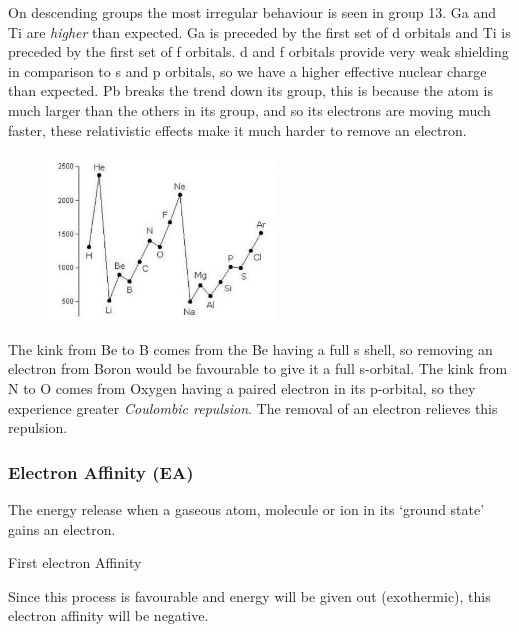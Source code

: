 \documentclass{article}
\begin{document}
    On descending groups the most irregular behaviour is seen in group 13. Ga and Ti are \emph{higher} than
    expected. Ga is preceded by the first set of d orbitals and Ti is preceded by the first set of f orbitals.
    d and f orbitals provide very weak shielding in comparison to s and p orbitals, so we have a higher effective
    nuclear charge than expected.
    Pb breaks the trend down its group, this is because the atom is much larger than the others in its group, and
    so its electrons are moving much faster, these relativistic effects make it much harder to remove an electron.

    \begin{figure}[h]
        \centering
        \includegraphics[width=6cm]{group13.jpg}
    \end{figure}

    The kink from Be to B comes from the Be having a full s shell, so removing an electron from Boron would be 
    favourable to give it a full s-orbital. The kink from N to O comes from Oxygen having a paired electron in its
    p-orbital, so they experience greater \emph{Coulombic repulsion}. The removal of an electron relieves this
    repulsion.

    \subsubsection{Electron Affinity (EA)} The energy release when a gaseous atom,
    molecule or ion in its `ground state' gains an electron.
    \begin{center}
         \hspace{4ex} First electron Affinity
    \end{center}

    Since this process is favourable and energy will be given out (exothermic),
    this electron affinity will be negative.
\end{document}
